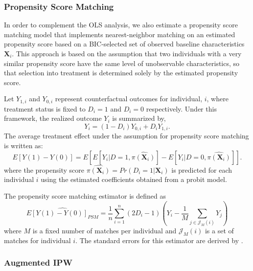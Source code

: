 \subsubsection{Propensity Score Matching}  \label{subsubsection:psm}

In order to complement the OLS analysis, we also estimate a propensity score matching model that implements nearest-neighbor matching on an estimated propensity score based on a BIC-selected set of observed baseline characteristics $\boldsymbol{X}_i$. This approach is based on the assumption that two individuals with a very similar propensity score have the same level of unobservable characteristics, so that selection into treatment is determined solely by the estimated propensity score. %

Let $Y_{1,i}$ and $Y_{0,i}$ represent counterfactual outcomes for individual, $i$, where treatment status is fixed to $D_i=1$ and $D_i=0$ respectively. Under this framework, the realized outcome $Y_i$ is summarized by,
\begin{equation}\label{eq:roy}
Y_i = (1-D_i)Y_{0,i} + D_iY_{1,i}.
\end{equation}
The average treatment effect under the assumption for propensity score matching is written as:
\begin{equation} \label{eq:ATE-PSM}
E[Y(1)-Y(0)] = E[E[Y_i|D=1, \hat{\pi(\boldsymbol{X}_i)}] - E[Y_i|D=0, \hat{\pi(\boldsymbol{X}_i)}]].
\end{equation}
where the propensity score $\hat{\pi({\boldsymbol{X}_i})} = Pr(D_i=1|\boldsymbol{X}_i)$ is predicted for each individual $i$ using the estimated coefficients obtained from a probit model.

The propensity score matching estimator is defined as
\begin{equation} \label{eq:PSM-estimator}
\widehat{E[Y(1)-Y(0)]_{PSM}} = \frac{1}{n} \sum_{i=1}^{n} (2D_i -1)(Y_i - \frac{1}{M}\sum_{j \in \mathcal{J}_M(i)}Y_j )
\end{equation}
where $M$ is a fixed number of matches per individual and $\mathcal{J}_M(i)$ is a set of matches for individual $i$. The standard errors for this estimator are derived by \cite{Abadie_Imbens_2006_Econometrica}.

\subsubsection{Augmented IPW} \label{subsubsection:aipw}

